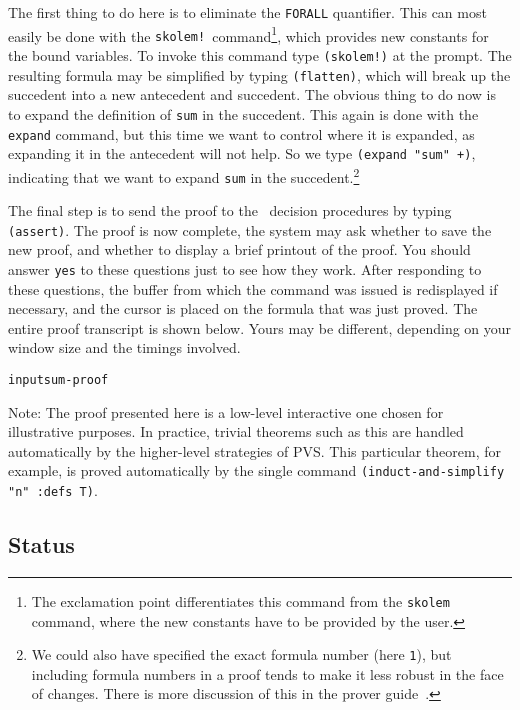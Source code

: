 The first thing to do here is to eliminate the {\tt FORALL} quantifier.
This can most easily be done with the {\tt skolem!}\
command\footnote{The exclamation point differentiates this command from
the {\tt skolem} command, where the new constants have to be provided by
the user.}, which provides new constants for the bound variables.  To
invoke this command type {\tt (skolem!)} at the prompt.  The resulting
formula may be simplified by typing {\tt (flatten)}, which will break up
the succedent into a new antecedent and succedent.  The obvious thing to
do now is to expand the definition of {\tt sum} in the succedent.  This
again is done with the {\tt expand} command, but this time we want to
control where it is expanded, as expanding it in the antecedent will not
help.  So we type {\tt (expand "sum" +)}, indicating that we want to
expand {\tt sum} in the succedent.\footnote{We could also have specified
the exact formula number (here {\tt 1}), but including formula numbers
in a proof tends to make it less robust in the face of changes.  There
is more discussion of this in the prover guide~\cite{PVS:prover}.}

The final step is to send the proof to the \pvs\ decision procedures
by typing {\tt (assert)}.  The proof is now complete, the system may
ask whether to save the new proof, and whether to display a brief
printout of the proof.  You should answer {\tt yes} to these questions
just to see how they work.  After responding to these questions, the
buffer from which the \cmd{prove} command was issued is redisplayed if
necessary, and the cursor is placed on the formula that was just
proved.  The entire proof transcript is shown below.  Yours may be
different, depending on your window size and the timings involved.

{\smaller\smaller\smaller\begin{alltt}
input{sum-proof}
\end{alltt}}

Note: The proof presented here is a low-level interactive one chosen
for illustrative purposes.  In practice, trivial theorems such as this
are handled automatically by the higher-level strategies of PVS.  This
particular theorem, for example, is proved automatically by the single
command {\tt (induct-and-simplify "n" :defs T)}.


\subsection{Status}

